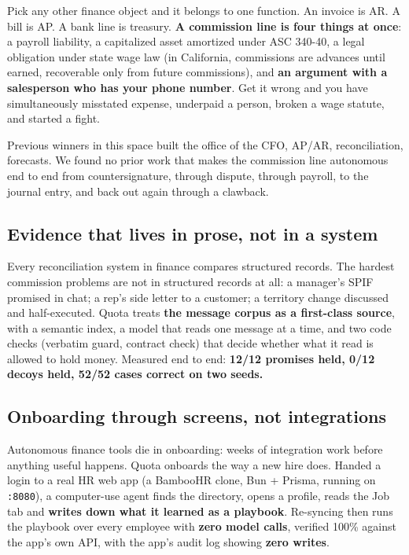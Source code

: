 \documentclass[10pt,a4paper]{article}
\newcommand{\gy}[1]{{\color{qgrey}#1}}
\newcommand{\code}[1]{{\small\texttt{#1}}}
\begin{document}
Pick any other finance object and it belongs to one function. An invoice is AR. A bill is AP. A bank line is treasury. \textbf{A commission line is four things at once}: a payroll liability, a capitalized asset amortized under ASC 340-40, a legal obligation under state wage law \gy{(in California, commissions are advances until earned, recoverable only from future commissions)}, and \textbf{an argument with a salesperson who has your phone number}. Get it wrong and you have simultaneously misstated expense, underpaid a person, broken a wage statute, and started a fight.

Previous winners in this space built the office of the CFO, AP/AR, reconciliation, forecasts. We found no prior work that makes the commission line autonomous end to end \textemdash{} from countersignature, through dispute, through payroll, to the journal entry, and back out again through a clawback.

\subsection{Evidence that lives in prose, not in a system}

Every reconciliation system in finance compares structured records. The hardest commission problems are not in structured records at all: a manager's SPIF promised in chat; a rep's side letter to a customer; a territory change discussed and half-executed. Quota treats \textbf{the message corpus as a first-class source}, with a semantic index, a model that reads one message at a time, and two code checks \gy{(verbatim guard, contract check)} that decide whether what it read is allowed to hold money. Measured end to end: \textbf{12/12 promises held, 0/12 decoys held, 52/52 cases correct on two seeds.}

\subsection{Onboarding through screens, not integrations}

Autonomous finance tools die in onboarding: weeks of integration work before anything useful happens. Quota onboards the way a new hire does. Handed a login to a real HR web app \gy{(a BambooHR clone, Bun + Prisma, running on \code{:8080})}, a computer-use agent finds the directory, opens a profile, reads the Job tab \textemdash{} and \textbf{writes down what it learned as a playbook}. Re-syncing then runs the playbook over every employee with \textbf{zero model calls}, verified 100\% against the app's own API, with the app's audit log showing \textbf{zero writes}.
\end{document}
